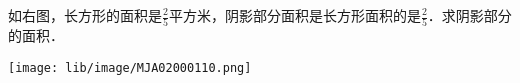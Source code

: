 如右图，长方形的面积是$\frac{2}{5}$平方米，阴影部分面积是长方形面积的是$\frac{2}{5}$．求阴影部分的面积．\\

\begin{minipage}[b]{0.65\linewidth}

\end{minipage}
\hfill
\begin{minipage}[b]{0.35\linewidth}
\begin{center}
	\texttt{[image: lib/image/MJA02000110.png]}
	\vspace{0.5cm}
\end{center}
\end{minipage}